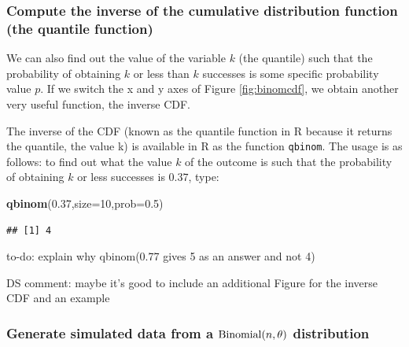 \documentclass[12pt,]{krantz}
\makeatletter
\newenvironment{Shaded}{\begin{snugshade}}{\end{snugshade}}
\newcommand{\KeywordTok}[1]{\textcolor[rgb]{0.13,0.29,0.53}{\textbf{#1}}}
\newcommand{\DataTypeTok}[1]{\textcolor[rgb]{0.13,0.29,0.53}{#1}}
\newcommand{\DecValTok}[1]{\textcolor[rgb]{0.00,0.00,0.81}{#1}}
\newcommand{\FloatTok}[1]{\textcolor[rgb]{0.00,0.00,0.81}{#1}}
\newcommand{\NormalTok}[1]{#1}
\newenvironment{kframe}{%
\medskip{}
\setlength{\fboxsep}{.8em}
 \def\at@end@of@kframe{}%
 \ifinner\ifhmode%
  \def\at@end@of@kframe{\end{minipage}}%
  \begin{minipage}{\columnwidth}%
 \fi\fi%
 \def\FrameCommand##1{\hskip\@totalleftmargin \hskip-\fboxsep
 \colorbox{shadecolor}{##1}\hskip-\fboxsep
     \hskip-\linewidth \hskip-\@totalleftmargin \hskip\columnwidth}%
 \MakeFramed {\advance\hsize-\width
   \@totalleftmargin\z@ \linewidth\hsize
   \@setminipage}}%
 {\par\unskip\endMakeFramed%
 \at@end@of@kframe}
\newenvironment{rmdblock}[1]
  {
  \begin{itemize}
  \renewcommand{\labelitemi}{
    \raisebox{-.7\height}[0pt][0pt]{
      {\setkeys{Gin}{width=3em,keepaspectratio}\texttt{[image: images/\#1]}}
    }
  }
  \setlength{\fboxsep}{1em}
  \begin{kframe}
  \item
  }
  {
  \end{kframe}
  \end{itemize}
  }
\newenvironment{rmdnote}
  {\begin{rmdblock}{note}}
  {\end{rmdblock}}
\theoremstyle{definition}
\theoremstyle{definition}
\theoremstyle{definition}
\theoremstyle{remark}
\makeatother
\begin{document}
\subsubsection{Compute the inverse of the cumulative distribution
function (the quantile
function)}\label{compute-the-inverse-of-the-cumulative-distribution-function-the-quantile-function}

We can also find out the value of the variable \(k\) (the quantile) such
that the probability of obtaining \(k\) or less than \(k\) successes is
some specific probability value \(p\). If we switch the x and y axes of
Figure \ref{fig:binomcdf}, we obtain another very useful function, the
inverse CDF.

The inverse of the CDF (known as the quantile function in R because it
returns the quantile, the value k) is available in R as the function
\texttt{qbinom}. The usage is as follows: to find out what the value
\(k\) of the outcome is such that the probability of obtaining \(k\) or
less successes is \(0.37\), type:

\begin{Shaded}
\begin{Highlighting}[]
\KeywordTok{qbinom}\NormalTok{(}\FloatTok{0.37}\NormalTok{,}\DataTypeTok{size=}\DecValTok{10}\NormalTok{,}\DataTypeTok{prob=}\FloatTok{0.5}\NormalTok{)}
\end{Highlighting}
\end{Shaded}

\begin{verbatim}
## [1] 4
\end{verbatim}

\begin{rmdnote} to-do: explain why qbinom(0.77 gives 5 as an
answer and not 4) \end{rmdnote}

\begin{rmdnote} DS comment: maybe it's good to include an
additional Figure for the inverse CDF and an example
\end{rmdnote}

\subsubsection{\texorpdfstring{Generate simulated data from a
\(\hbox{Binomial}(n,\theta)\)
distribution}{Generate simulated data from a \textbackslash{}hbox\{Binomial\}(n,\textbackslash{}theta) distribution}}\label{generate-simulated-data-from-a-hboxbinomialntheta-distribution}
\end{document}
